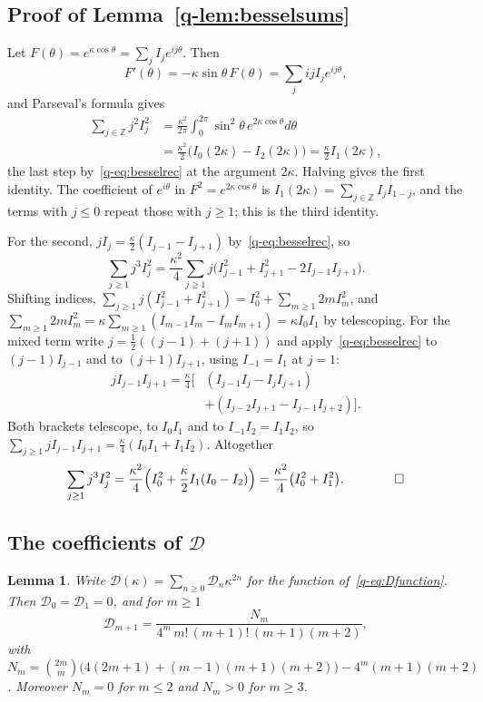 \documentclass[aps,prd,twocolumn,superscriptaddress,nofootinbib,longbibliography,floatfix,amsmath,amssymb,10pt]{revtex4-2}
\newtheorem{lemma}[theorem]{Lemma}
\theoremstyle{definition}
\theoremstyle{remark}
\newcommand{\Z}{\mathbb{Z}}
\begin{document}
\subsection{Proof of Lemma~\ref{q-lem:besselsums}}

Let $F(\theta)=e^{\kappa\cos\theta}=\sum_jI_je^{ij\theta}$. Then
\[
F'(\theta)=-\kappa\sin\theta\,F(\theta)=\sum_jijI_je^{ij\theta},
\]
and Parseval's formula gives
\[
\begin{aligned}
\sum_{j\in\Z}j^2I_j^2&=\frac{\kappa^2}{2\pi}\int_0^{2\pi}\sin^2\theta\,
e^{2\kappa\cos\theta}d\theta\\
&=\frac{\kappa^2}2\bigl(I_0(2\kappa)-I_2(2\kappa)\bigr)=\frac\kappa2I_1(2\kappa),
\end{aligned}
\]
the last step by~\eqref{q-eq:besselrec} at the argument $2\kappa$. Halving gives
the first identity. The coefficient of $e^{i\theta}$ in $F^2=e^{2\kappa\cos
\theta}$ is $I_1(2\kappa)=\sum_{j\in\Z}I_jI_{1-j}$, and the terms with $j\le0$
repeat those with $j\ge1$; this is the third identity.

For the second, $jI_j=\frac\kappa2(I_{j-1}-I_{j+1})$ by~\eqref{q-eq:besselrec}, so
\[
\sum_{j\ge1}j^3I_j^2=\frac{\kappa^2}4\sum_{j\ge1}j\bigl(I_{j-1}^2+I_{j+1}^2-
2I_{j-1}I_{j+1}\bigr).
\]
Shifting indices, $\sum_{j\ge1}j(I_{j-1}^2+I_{j+1}^2)=I_0^2+\sum_{m\ge1}2m
I_m^2$, and $\sum_{m\ge1}2mI_m^2=\kappa\sum_{m\ge1}(I_{m-1}I_m-I_mI_{m+1})=
\kappa I_0I_1$ by telescoping. For the mixed term write $j=\frac12((j-1)+(j+1))$
and apply~\eqref{q-eq:besselrec} to $(j-1)I_{j-1}$ and to $(j+1)I_{j+1}$,
using $I_{-1}=I_1$ at $j=1$:
\[
\begin{aligned}
jI_{j-1}I_{j+1}=\frac\kappa4\bigl[&(I_{j-1}I_j-I_jI_{j+1})\\
&+(I_{j-2}I_{j+1}-I_{j-1}I_{j+2})\bigr].
\end{aligned}
\]
Both brackets telescope, to $I_0I_1$ and to $I_{-1}I_2=I_1I_2$, so
$\sum_{j\ge1}jI_{j-1}I_{j+1}=\frac\kappa4(I_0I_1+I_1I_2)$. Altogether
\[
\sum_{j\ge1}j^3I_j^2=\frac{\kappa^2}4\Bigl(I_0^2+\frac\kappa2I_1(I_0-I_2)
\Bigr)=\frac{\kappa^2}4\bigl(I_0^2+I_1^2\bigr). \qquad\qed
\]

\subsection{\texorpdfstring{The coefficients of $\mathcal D$}{The coefficients of D}}

\begin{lemma}\label{q-lem:Dcoef}
Write $\mathcal D(\kappa)=\sum_{n\ge0}\mathcal D_n\kappa^{2n}$ for the function
of~\eqref{q-eq:Dfunction}. Then $\mathcal D_0=\mathcal D_1=0$, and for $m\ge1$
\[
\mathcal D_{m+1}=\frac{N_m}{4^m\,m!\,(m+1)!\,(m+1)(m+2)},
\]
with $N_m=\binom{2m}m\bigl(4(2m+1)+(m-1)(m+1)(m+2)\bigr)-4^m(m+1)(m+2)$.
Moreover $N_m=0$ for $m\le2$ and $N_m>0$ for $m\ge3$.
\end{lemma}
\end{document}
